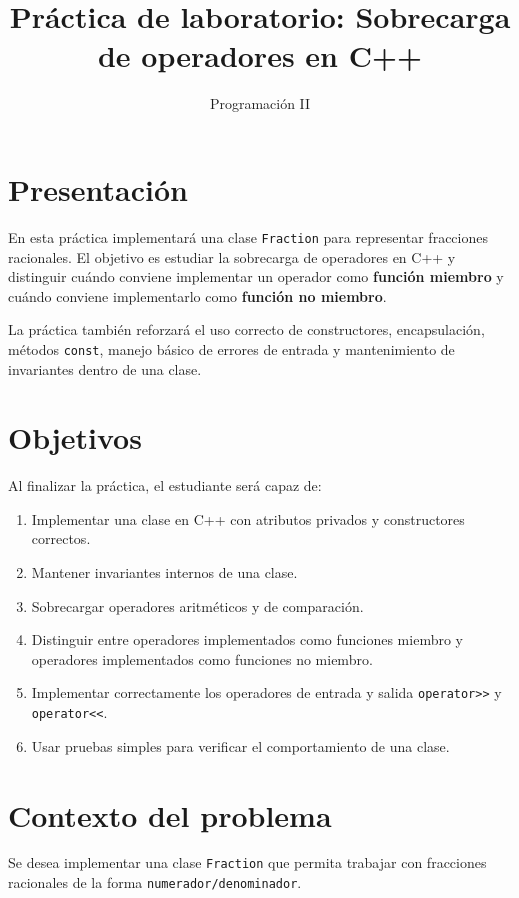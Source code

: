 \documentclass[11pt,a4paper]{article}
\title{Práctica de laboratorio: Sobrecarga de operadores en C++}
\author{Programación II}
\date{}
\begin{document}
\maketitle

\section{Presentación}

En esta práctica implementará una clase \lstinline|Fraction| para representar fracciones racionales. El objetivo es estudiar la sobrecarga de operadores en C++ y distinguir cuándo conviene implementar un operador como \textbf{función miembro} y cuándo conviene implementarlo como \textbf{función no miembro}.

La práctica también reforzará el uso correcto de constructores, encapsulación, métodos \lstinline|const|, manejo básico de errores de entrada y mantenimiento de invariantes dentro de una clase.

\section{Objetivos}

Al finalizar la práctica, el estudiante será capaz de:

\begin{enumerate}
  \item Implementar una clase en C++ con atributos privados y constructores correctos.
  \item Mantener invariantes internos de una clase.
  \item Sobrecargar operadores aritméticos y de comparación.
  \item Distinguir entre operadores implementados como funciones miembro y operadores implementados como funciones no miembro.
  \item Implementar correctamente los operadores de entrada y salida \lstinline|operator>>| y \lstinline|operator<<|.
  \item Usar pruebas simples para verificar el comportamiento de una clase.
\end{enumerate}

\section{Contexto del problema}

Se desea implementar una clase \lstinline|Fraction| que permita trabajar con fracciones racionales de la forma \lstinline|numerador/denominador|.
\end{document}

